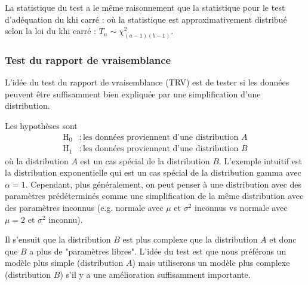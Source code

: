\documentclass[french]{article}
\begin{document}
\begin{multicols*}{2}
\begin{definitionNOHFILL}
\bigskip

La statistique du test a le même raisonnement que la statistique pour le test d'adéquation du khi carré :  où la statistique est approximativement distribué selon la loi du khi carré : $T_{n} \sim \chi^{2}_{(a - 1)(b - 1)}$. 

\end{definitionNOHFILL}



\columnbreak
\subsubsection{Test du rapport de vraisemblance}\label{subsubsec:TRV}
\begin{rappel_enhanced}[Motivation]
L'idée du test du rapport de vraisemblance (TRV) est de tester si les données peuvent être suffisamment bien expliquée par une simplification d'une distribution. 
\end{rappel_enhanced}

\begin{definitionNOHFILL}
Les hypothèses sont 
\begin{align*}
	\textrm{H}_{0}	&:	\text{les données proviennent d'une distribution $A$}	\\
	\textrm{H}_{1}	&:	\text{les données proviennent d'une distribution $B$}
\end{align*}
où la distribution $A$ est un cas spécial de la distribution $B$. L'exemple intuitif est la distribution exponentielle qui est un cas spécial de la distribution gamma avec $\alpha = 1$. Cependant, plus généralement, on peut penser à une distribution avec des paramètres prédéterminés comme une simplification de la même distribution avec des paramètres inconnus (e.g. normale avec $\mu$ et $\sigma^{2}$ inconnus vs normale avec $\mu = 2$ et $\sigma^{2}$ inconnu).

\bigskip

Il s'ensuit que la distribution $B$ est plus complexe que la distribution $A$ et donc que $B$ a plus de "paramètres libres". L'idée du test est que nous préférons un modèle plus simple (distribution $A$) mais utiliserons un modèle plus complexe (distribution $B$) s'il y a une amélioration suffisamment importante.


\end{definitionNOHFILL}
\end{multicols*}
\end{document}
